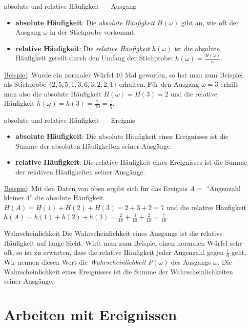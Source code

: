 \begin{bla}{absolute und relative Häufigkeit --- Ausgang}
  \begin{itemize}
    \item \textbf{absolute Häufigkeit}: Die \emph{absolute Häufigkeit} $H(\omega)$ gibt an, wie oft der Ausgang $\omega$ in der Stichprobe vorkommt.
    \item \textbf{relative Häufigkeit}: Die \emph{relative Häufigkeit} $h(\omega)$ ist die absolute Häufigkeit geteilt durch den Umfang der Stichprobe: $h(\omega)=\frac{H(\omega)}{n}$.
  \end{itemize}
  \underline{Beispiel}: Wurde ein normaler Würfel $10$ Mal geworfen, so hat man zum Beispiel als Stichprobe $\{2,5,5,1,3,6,3,2,2,1\}$ erhalten. Für den Ausgang $\omega=3$ erhält man also die absolute Häufigkeit $H(\omega)=H(3)=2$ und die relative Häufigkeit $h(\omega)=h(3)=\tfrac{2}{10}=\tfrac{1}{5}$.
\end{bla}

\begin{bla}{absolute und relative Häufigkeit --- Ereignis}
  \begin{itemize}
    \item \textbf{absolute Häufigkeit}: Die absolute Häufigkeit eines Ereignisses ist die Summe der absoluten Häufigkeiten seiner Ausgänge.
    \item \textbf{relative Häufigkeit}: Die relative Häufigkeit eines Ereignisses ist die Summe der relativen Häufigkeiten seiner Ausgänge.
  \end{itemize}
  \underline{Beispiel}: Mit den Daten von oben ergibt sich für das Ereignis $A=$ "`Augenzahl kleiner $4$"' die absolute Häufigkeit $H(A)=H(1)+H(2)+H(3)=2+3+2=7$ und die relative Häufigkeit $h(A)=h(1)+h(2)+h(3)=\tfrac{2}{10}+\tfrac{3}{10}+\tfrac{2}{10}=\tfrac{7}{10}$.
\end{bla}

\begin{bla}{Wahrscheinlichkeit}
  Die Wahrscheinlichkeit eines Ausgangs ist die relative Häufigkeit auf lange Sicht. Wirft man zum Beispiel einen normalen Würfel sehr oft, so ist zu erwarten, dass die relative Häufigkeit jeder Augenzahl gegen $\tfrac{1}{6}$ geht. Wir nennen diesen Wert die \emph{Wahrscheinlichkeit} $P(\omega)$ des Ausgangs $\omega$. Die Wahrscheinlichkeit eines Ereignisses ist die Summe der Wahrscheinlichkeiten seiner Ausgänge.
\end{bla}

\section{Arbeiten mit Ereignissen}

